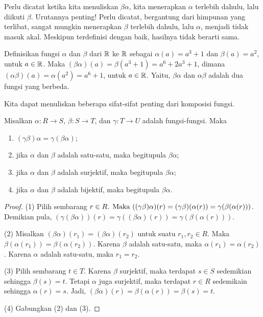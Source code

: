 Perlu dicatat ketika kita menuliskan $\beta \alpha$, kita menerapkan $\alpha$ terlebih dahulu, lalu diikuti $\beta$. Urutannya penting! Perlu dicatat, bergantung dari himpunan yang terlibat, sangat mungkin menerapkan $\beta$ terlebih dahulu, lalu $\alpha$, menjadi tidak masuk akal. Meskipun terdefinisi dengan baik, hasilnya tidak berarti sama.

\begin{exmp}
\label{exmp1.28}
Definisikan fungsi $\alpha$ dan $\beta$ dari $\mathbb{R}$ ke $\mathbb{R}$ sebagai $\alpha(a) = a^3 + 1$ dan $\beta(a) = a^2$, untuk $a\in \mathbb{R}$. Maka $(\beta \alpha)(a) = \beta(a^3+1) = a^6 + 2 a^3 + 1$, dimana $(\alpha \beta)(a) = \alpha(a^2) = a^6 + 1$, untuk $a \in \mathbb{R}$. Yaitu, $\beta \alpha$ dan $\alpha \beta$ adalah dua fungsi yang berbeda.
\end{exmp}

Kita dapat menuliskan beberapa sifat-sifat penting dari komposisi fungsi.

\begin{thm}
\label{thm1.2}
Misalkan $\alpha : R \rightarrow S$, $\beta : S \rightarrow T$, dan $\gamma : T \rightarrow U$ adalah fungsi-fungsi. Maka
\begin{enumerate}
    \item \( (\gamma \beta) \alpha = \gamma (\beta \alpha) \);
    \item jika $\alpha$ dan $\beta$ adalah satu-satu, maka begitupula $\beta \alpha$;
    \item jika $\alpha$ dan $\beta$ adalah surjektif, maka begitupula $\beta \alpha$;
    \item jika $\alpha$ dan $\beta$ adalah bijektif, maka begitupula $\beta \alpha$.
\end{enumerate}
\end{thm}

\begin{proof}
(1) Pilih sembarang \(r \in R$. Maka $((\gamma \beta) \alpha)(r) = (\gamma \beta)(\alpha(r)) = \gamma (\beta( \alpha(r))) \). Demikian pula, \( (\gamma(\beta \alpha))(r) = \gamma((\beta \alpha)(r)) = \gamma(\beta(\alpha(r))) \).

(2) Misalkan $(\beta \alpha)(r_1) = (\beta \alpha)(r_2)$ untuk suatu $r_1, r_2 \in R$. Maka $\beta(\alpha(r_1)) = \beta(\alpha(r_2))$. Karena $\beta$ adalah satu-satu, maka $\alpha(r_1) = \alpha(r_2)$. Karena $\alpha$ adalah satu-satu, maka $r_1 = r_2$.

(3) Pilih sembarang $t \in T$. Karena $\beta$ surjektif, maka terdapat $s \in S$ sedemikian sehingga $\beta(s) = t$. Tetapi $\alpha$ juga surjektif, maka terdapat $r \in R$ sedemikain sehingga $\alpha(r) = s$. Jadi, \( (\beta \alpha)(r) = \beta(\alpha(r)) = \beta(s) = t \).

(4) Gabungkan (2) dan (3).
\end{proof}

